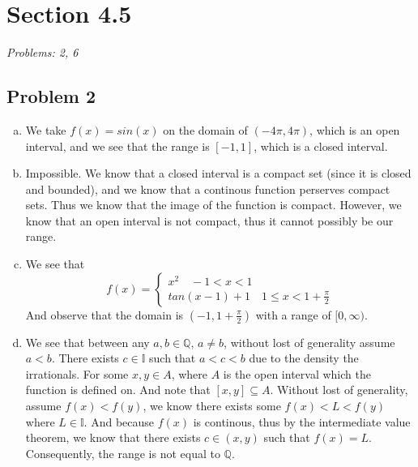 \documentclass[12pt]{article}
\begin{document}

\section*{Section 4.5}
\textit{Problems: 2, 6}
\subsection*{Problem 2}
\begin{enumerate}[a).]
    \item {
        We take $f(x) = sin(x)$ on the domain of $(-4\pi, 4 \pi)$, which is an open interval, and we see that the range is $[-1, 1]$, which is a closed interval.
    }
    \item {
        Impossible. 
        We know that a closed interval is a compact set (since it is closed and bounded), and we know that a continous function perserves compact sets. 
        Thus we know that the image of the function is compact. 
        However, we know that an open interval is not compact, thus it cannot possibly be our range. 
    }
    \item {
        We see that 
        $$
            f(x) =
            \left\{
                \begin{array}{ll}
                    x^2 \quad -1 < x < 1 \\
                    tan(x-1)+1 \quad 1 \le x < 1 + \frac{\pi}{2}
                    
                \end{array} \right.
        $$
        And observe that the domain is $(-1, 1 + \frac{\pi}{2})$ with a range of $[0, \infty)$. 
    }
    \item {
        We see that between any $a,b \in \mathbb{Q}$, $a \ne b$, without lost of generality assume $a < b$. 
        There exists $c \in \mathbb{I}$ such that $a< c < b$ due to the density the irrationals. 
        For some $x, y \in A$, where $A$ is the open interval which the function is defined on.
        And note that $[x,y] \subseteq A$.
        Without lost of generality, assume $f(x) < f(y)$, we know there exists some $f(x) < L < f(y)$ where $L \in \mathbb{I}$. 
        And because $f(x)$ is continous, thus by the intermediate value theorem, we know that there exists $c \in (x,y)$ such that $f(x) = L$. 
        Consequently, the range is not equal to $\mathbb{Q}$. 
    }
\end{enumerate}
\end{document}
